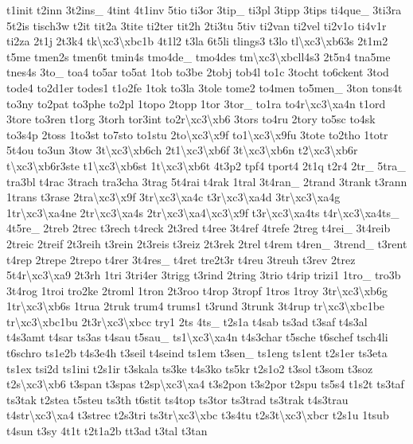 \begin{DoxyCompactItemize}
t1init t2inn 3t2ins\-\_\- 4tint 4t1inv 5tio ti3or 3tip\-\_\- ti3pl 3tipp 3tips ti4que\-\_\- 3ti3ra 5t2is tisch3w t2it tit2a 3tite ti2ter tit2h 2ti3tu 5tiv ti2van ti2vel ti2v1o ti4v1r ti2za 2t1j 2t3k4 tk\textbackslash{}xc3\textbackslash{}xbc1b 4t1l2 t3la 6t5li tlings3 t3lo tl\textbackslash{}xc3\textbackslash{}xb63s 2t1m2 t5me tmen2s tmen6t tmin4s tmo4de\-\_\- tmo4des tm\textbackslash{}xc3\textbackslash{}xbcll4s3 2t5n4 tna5me tnes4s 3to\-\_\- toa4 to5ar to5at 1tob to3be 2tobj tob4l to1c 3tocht to6ckent 3tod tode4 to2d1er todes1 t1o2fe 1tok to3la 3tole tome2 to4men to5men\-\_\- 3ton tons4t to3ny to2pat to3phe to2pl 1topo 2topp 1tor 3tor\-\_\- to1ra to4r\textbackslash{}xc3\textbackslash{}xa4n t1ord 3tore to3ren t1org 3torh tor3int to2r\textbackslash{}xc3\textbackslash{}xb6 3tors to4ru 2tory to5sc to4sk to3s4p 2toss 1to3st to7sto to1stu 2to\textbackslash{}xc3\textbackslash{}x9f to1\textbackslash{}xc3\textbackslash{}x9fu 3tote to2tho 1totr 5t4ou to3un 3tow 3t\textbackslash{}xc3\textbackslash{}xb6ch 2t1\textbackslash{}xc3\textbackslash{}xb6f 3t\textbackslash{}xc3\textbackslash{}xb6n t2\textbackslash{}xc3\textbackslash{}xb6r t\textbackslash{}xc3\textbackslash{}xb6r3ste t1\textbackslash{}xc3\textbackslash{}xb6st 1t\textbackslash{}xc3\textbackslash{}xb6t 4t3p2 tpf4 tport4 2t1q t2r4 2tr\-\_\- 5tra\-\_\- tra3bl t4rac 3trach tra3cha 3trag 5t4rai t4rak 1tral 3t4ran\-\_\- 2trand 3trank t3rann 1trans t3rase 2tra\textbackslash{}xc3\textbackslash{}x9f 3tr\textbackslash{}xc3\textbackslash{}xa4c t3r\textbackslash{}xc3\textbackslash{}xa4d 3tr\textbackslash{}xc3\textbackslash{}xa4g 1tr\textbackslash{}xc3\textbackslash{}xa4ne 2tr\textbackslash{}xc3\textbackslash{}xa4s 2tr\textbackslash{}xc3\textbackslash{}xa4\textbackslash{}xc3\textbackslash{}x9f t3r\textbackslash{}xc3\textbackslash{}xa4ts t4r\textbackslash{}xc3\textbackslash{}xa4ts\-\_\- 4t5re\-\_\- 2treb 2trec t3rech t4reck 2t3red t4ree 3t4ref 4trefe 2treg t4rei\-\_\- 3t4reib 2treic 2treif 2t3reih t3rein 2t3reis t3reiz 2t3rek 2trel t4rem t4ren\-\_\- 3trend\-\_\- t3rent t4rep 2trepe 2trepo t4rer 3t4res\-\_\- t4ret tre2t3r t4reu 3treuh t3rev 2trez 5t4r\textbackslash{}xc3\textbackslash{}xa9 2t3rh 1tri 3tri4er 3trigg t3rind 2tring 3trio t4rip trizi1 1tro\-\_\- tro3b 3t4rog 1troi tro2ke 2troml 1tron 2t3roo t4rop 3tropf 1tros 1troy 3tr\textbackslash{}xc3\textbackslash{}xb6g 1tr\textbackslash{}xc3\textbackslash{}xb6s 1trua 2truk trum4 trums1 t3rund 3trunk 3t4rup tr\textbackslash{}xc3\textbackslash{}xbc1be tr\textbackslash{}xc3\textbackslash{}xbc1bu 2t3r\textbackslash{}xc3\textbackslash{}xbcc try1 2ts 4ts\-\_\- t2s1a t4sab ts3ad t3saf t4s3al t4s3amt t4sar ts3as t4sau t5sau\-\_\- ts1\textbackslash{}xc3\textbackslash{}xa4n t4s3char t5sche t6schef tsch4li t6schro ts1e2b t4s3e4h t3seil t4seind ts1em t3sen\-\_\- ts1eng ts1ent t2s1er ts3eta ts1ex tsi2d ts1ini t2s1ir t3skala ts3ke t4s3ko ts5kr t2s1o2 t3sol t3som t3soz t2s\textbackslash{}xc3\textbackslash{}xb6 t3span t3spas t2sp\textbackslash{}xc3\textbackslash{}xa4 t3s2pon t3s2por t2spu ts5s4 t1s2t ts3taf ts3tak t2stea t5steu ts3th t6stit ts4top ts3tor ts3trad ts3trak t4s3trau t4str\textbackslash{}xc3\textbackslash{}xa4 t3strec t2s3tri ts3tr\textbackslash{}xc3\textbackslash{}xbc t3s4tu t2s3t\textbackslash{}xc3\textbackslash{}xbcr t2s1u 1tsub t4sun t3sy 4t1t t2t1a2b tt3ad t3tal t3tan 
\end{DoxyCompactItemize}
